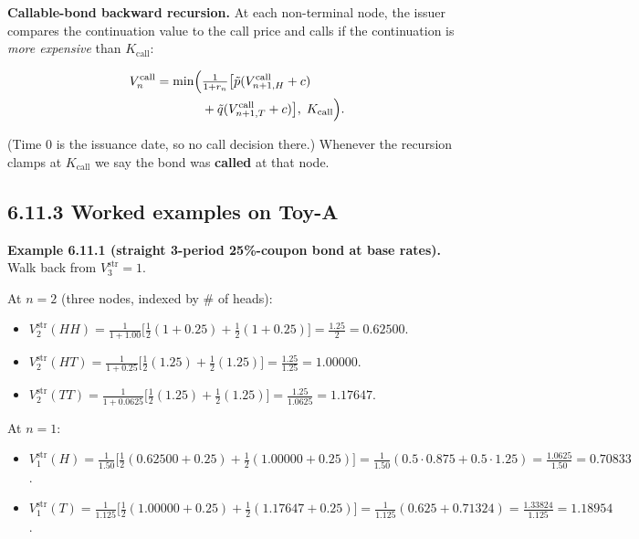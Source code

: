 \documentclass[
  10pt,
  twoside]{book}
\providecommand{\tightlist}{%
  \setlength{\itemsep}{0pt}\setlength{\parskip}{0pt}}
\begin{document}
\textbf{Callable-bond backward recursion.} At each non-terminal node,
the issuer compares the continuation value to the call price and calls
if the continuation is \emph{more expensive} than \(K_{\text{call}}\):

\[\begin{aligned}
V_n^{\text{call}} = \min\Bigl(&\tfrac{1}{1 + r_n}\bigl[\tilde p (V_{n+1, H}^{\text{call}} + c) \\
&+ \tilde q (V_{n+1, T}^{\text{call}} + c)\bigr],\; K_{\text{call}}\Bigr).
\end{aligned}\]

(Time 0 is the issuance date, so no call decision there.) Whenever the
recursion clamps at \(K_{\text{call}}\) we say the bond was
\textbf{called} at that node.

\subsection{6.11.3 Worked examples on
Toy-A}\label{worked-examples-on-toy-a}

\textbf{Example 6.11.1 (straight 3-period 25\%-coupon bond at base
rates).} Walk back from \(V_3^{\text{str}} = 1\).

At \(n = 2\) (three nodes, indexed by \# of heads):

\begin{itemize}
\tightlist
\item
  \(V_2^{\text{str}}(HH) = \tfrac{1}{1 + 1.00}\bigl[\tfrac{1}{2}(1 + 0.25) + \tfrac{1}{2}(1 + 0.25)\bigr] = \tfrac{1.25}{2} = 0.62500\).
\item
  \(V_2^{\text{str}}(HT) = \tfrac{1}{1 + 0.25}\bigl[\tfrac{1}{2}(1.25) + \tfrac{1}{2}(1.25)\bigr] = \tfrac{1.25}{1.25} = 1.00000\).
\item
  \(V_2^{\text{str}}(TT) = \tfrac{1}{1 + 0.0625}\bigl[\tfrac{1}{2}(1.25) + \tfrac{1}{2}(1.25)\bigr] = \tfrac{1.25}{1.0625} = 1.17647\).
\end{itemize}

At \(n = 1\):

\begin{itemize}
\tightlist
\item
  \(V_1^{\text{str}}(H) = \tfrac{1}{1.50}\bigl[\tfrac{1}{2}(0.62500 + 0.25) + \tfrac{1}{2}(1.00000 + 0.25)\bigr] = \tfrac{1}{1.50}(0.5 \cdot 0.875 + 0.5 \cdot 1.25) = \tfrac{1.0625}{1.50} = 0.70833\).
\item
  \(V_1^{\text{str}}(T) = \tfrac{1}{1.125}\bigl[\tfrac{1}{2}(1.00000 + 0.25) + \tfrac{1}{2}(1.17647 + 0.25)\bigr] = \tfrac{1}{1.125}(0.625 + 0.71324) = \tfrac{1.33824}{1.125} = 1.18954\).
\end{itemize}
\end{document}

